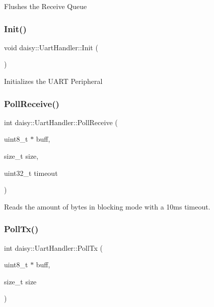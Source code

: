 Flushes the Receive Queue \mbox{\label{classdaisy_1_1_uart_handler_abe1b41b60b230b27b0a62d2a0c1c0f67}} 
\subsubsection{\texorpdfstring{Init()}{Init()}}
{\footnotesize\ttfamily void daisy\+::\+Uart\+Handler\+::\+Init (\begin{DoxyParamCaption}{ }\end{DoxyParamCaption})}

Initializes the U\+A\+RT Peripheral \mbox{\label{classdaisy_1_1_uart_handler_a9641f3808cf70559d3d988f5ae8e254c}} 
\subsubsection{\texorpdfstring{Poll\+Receive()}{PollReceive()}}
{\footnotesize\ttfamily int daisy\+::\+Uart\+Handler\+::\+Poll\+Receive (\begin{DoxyParamCaption}\item[{uint8\+\_\+t $\ast$}]{buff,  }\item[{size\+\_\+t}]{size,  }\item[{uint32\+\_\+t}]{timeout }\end{DoxyParamCaption})}

Reads the amount of bytes in blocking mode with a 10ms timeout. \mbox{\label{classdaisy_1_1_uart_handler_a9c0739a29ccf7506a86e7ac9953e0a6f}} 
\subsubsection{\texorpdfstring{Poll\+Tx()}{PollTx()}}
{\footnotesize\ttfamily int daisy\+::\+Uart\+Handler\+::\+Poll\+Tx (\begin{DoxyParamCaption}\item[{uint8\+\_\+t $\ast$}]{buff,  }\item[{size\+\_\+t}]{size }\end{DoxyParamCaption})}

